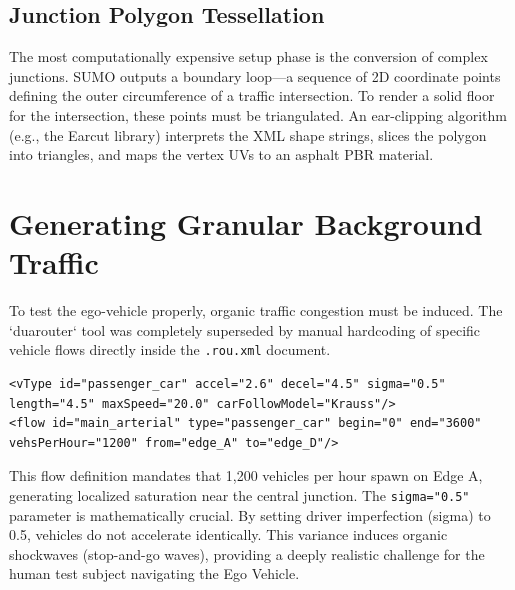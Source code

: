 \subsection{Junction Polygon Tessellation}

The most computationally expensive setup phase is the conversion of complex junctions. SUMO outputs a boundary loop—a sequence of 2D coordinate points defining the outer circumference of a traffic intersection. To render a solid floor for the intersection, these points must be triangulated. An ear-clipping algorithm (e.g., the Earcut library) interprets the XML shape strings, slices the polygon into triangles, and maps the vertex UVs to an asphalt PBR material. 

\section{Generating Granular Background Traffic}

To test the ego-vehicle properly, organic traffic congestion must be induced. The `duarouter` tool was completely superseded by manual hardcoding of specific vehicle flows directly inside the \texttt{.rou.xml} document.

\begin{lstlisting}
<vType id="passenger_car" accel="2.6" decel="4.5" sigma="0.5" length="4.5" maxSpeed="20.0" carFollowModel="Krauss"/>
<flow id="main_arterial" type="passenger_car" begin="0" end="3600" vehsPerHour="1200" from="edge_A" to="edge_D"/>
\end{lstlisting}

This flow definition mandates that 1,200 vehicles per hour spawn on Edge A, generating localized saturation near the central junction. The \texttt{sigma="0.5"} parameter is mathematically crucial. By setting driver imperfection (sigma) to 0.5, vehicles do not accelerate identically. This variance induces organic shockwaves (stop-and-go waves), providing a deeply realistic challenge for the human test subject navigating the Ego Vehicle.
